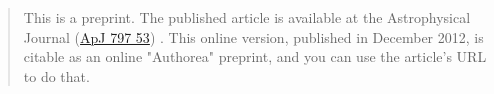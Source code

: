 \begin{quote}
This is a preprint. The published article is available at the Astrophysical Journal (\href{http://iopscience.iop.org/0004-637X/797/1/53/}{ApJ 797 53}) \cite{Goodman_2014}. This online version, published in December 2012, is citable as an online "Authorea" preprint, and you can use the article's URL to do that.
\end{quote}
